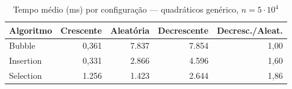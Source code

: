 \begin{table}[htbp]\centering\small
\caption{Tempo médio (ms) por configuração — quadráticos genérico, $n = 5\cdot10^4$}\label{tab:cfg-gen-50k}
\begin{tabular}{lrrrr}
\toprule
Algoritmo & Crescente & Aleatória & Decrescente & Decresc./Aleat. \\
\midrule
Bubble & 0,361 & 7.837 & 7.854 & 1,00 \\
Insertion & 0,331 & 2.866 & 4.596 & 1,60 \\
Selection & 1.256 & 1.423 & 2.644 & 1,86 \\
\bottomrule
\end{tabular}
\end{table}